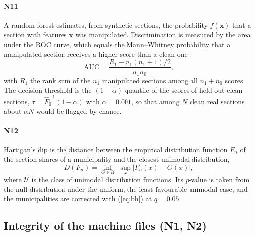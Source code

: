 \paragraph{N11} A random forest \cite{breiman2001,wright2017} estimates,
from synthetic sections, the probability $\hat f(\mathbf x)$ that a section
with features $\mathbf x$ was manipulated. Discrimination is measured by the area under the ROC curve, which
equals the Mann--Whitney probability that a manipulated section receives a
higher score than a clean one \cite{mann1947,hanley1982}:
\begin{equation}
\mathrm{AUC}=\frac{R_1-n_1(n_1+1)/2}{n_1n_0},
\label{eq:auc}
\end{equation}
with $R_1$ the rank sum of the $n_1$ manipulated sections among all
$n_1+n_0$ scores. The decision threshold is the $(1-\alpha)$ quantile of
the scores of held-out clean sections, $\tau=\hat F_0^{-1}(1-\alpha)$ with
$\alpha=0.001$, so that among $N$ clean real sections about $\alpha N$
would be flagged by chance.

\paragraph{N12} Hartigan's dip \cite{hartigan1985} is the distance between
the empirical distribution function $F_n$ of the section shares of a
municipality and the closest unimodal distribution,
\begin{equation}
D(F_n)=\inf_{G\in\mathcal U}\;\sup_x\bigl|F_n(x)-G(x)\bigr|,
\label{eq:dip}
\end{equation}
where $\mathcal U$ is the class of unimodal distribution functions. Its
$p$-value is taken from the null distribution under the uniform, the least
favourable unimodal case, and the municipalities are corrected with
(\ref{eq:bh}) at $q=0.05$.

\subsection{Integrity of the machine files (N1, N2)}

